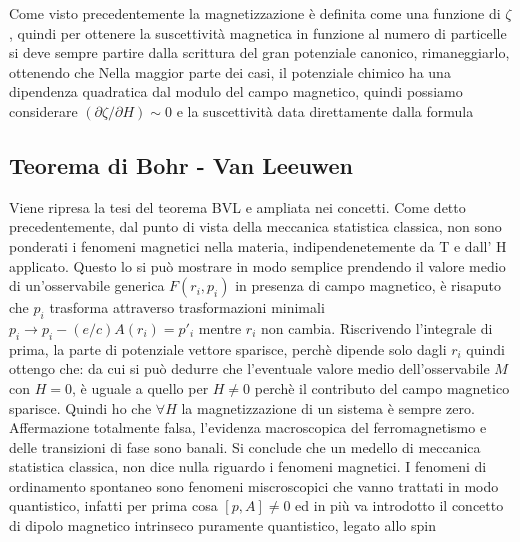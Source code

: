 Come visto precedentemente la magnetizzazione è definita come una funzione di $\zeta$, quindi per ottenere la suscettività magnetica in funzione al numero di particelle si deve sempre partire dalla scrittura del gran potenziale canonico, rimaneggiarlo, ottenendo che
Nella maggior parte dei casi, il potenziale chimico ha una dipendenza quadratica dal modulo del campo magnetico, quindi possiamo considerare $(\partial \zeta / \partial H) \sim 0$ e la suscettività data direttamente dalla formula
\subsection{Teorema di Bohr - Van Leeuwen}
Viene ripresa la tesi del teorema BVL e ampliata nei concetti. Come detto precedentemente, dal punto di vista della meccanica statistica classica, non sono ponderati i fenomeni magnetici nella materia, indipendenetemente da T e dall' {\vet H} applicato. Questo lo si può mostrare in modo semplice prendendo il valore medio di un'osservabile generica $F(r_i,p_i)$
in presenza di campo magnetico, è risaputo che $p_i$  trasforma attraverso trasformazioni minimali $p_i \to p_i -(e/c)A(r_i) = p'_i$ mentre $r_i$ non cambia. Riscrivendo l'integrale di prima, la parte di potenziale vettore sparisce, perchè dipende solo dagli $r_i$ quindi ottengo che:
da cui si può dedurre che l'eventuale valore medio dell'osservabile $M$ con $H=0$, è uguale a quello per $H\neq0$ perchè il contributo del campo magnetico sparisce. Quindi ho che $\forall H$ 
la magnetizzazione di un sistema è sempre zero. Affermazione totalmente falsa, l'evidenza macroscopica del ferromagnetismo e delle transizioni di fase sono banali. Si conclude che un medello di meccanica statistica classica, non dice nulla riguardo i fenomeni magnetici. I fenomeni di ordinamento spontaneo sono fenomeni miscroscopici che vanno trattati in modo quantistico, infatti per prima cosa $\left[p,A\right]\neq 0$ ed in più va introdotto il concetto di dipolo magnetico intrinseco puramente quantistico, legato allo spin
